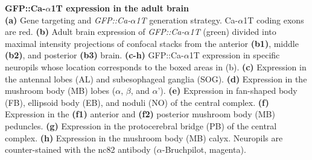 \label{fig:2} 
\textbf{GFP::Ca-$\alpha$1T expression in the adult brain} 
\\ 
\textbf{(a)} Gene targeting and \emph{GFP::Ca-$\alpha$1T} generation strategy. 
Ca-$\alpha$1T coding exons are red.
\textbf{(b)} Adult brain expression of \emph{GFP::Ca-$\alpha$1T} (green) divided into maximal intensity projections of confocal stacks from the anterior \textbf{(b1)}, middle \textbf{(b2)}, and posterior \textbf{(b3)} brain.
\textbf{(c-h)} GFP::Ca-$\alpha$1T expression in specific neuropils whose location corresponds to the boxed areas in (b).
\textbf{(c)} Expression in the antennal lobes (AL) and subesophageal ganglia (SOG).
\textbf{(d)} Expression in the mushroom body (MB) lobes ($\alpha$, $\beta$, and $\alpha$'). 
\textbf{(e)} Expression in fan-shaped body (FB), ellipsoid body (EB), and noduli (NO) of the central complex.
\textbf{(f)} Expression in the \textbf{(f1)} anterior and \textbf{(f2)} posterior mushroom body (MB) peduncles.
\textbf{(g)} Expression in the protocerebral bridge (PB) of the central complex. 
\textbf{(h)} Expression in the mushroom body (MB) calyx. 
Neuropils are counter-stained with the nc82 antibody ($\alpha$-Bruchpilot, magenta).

